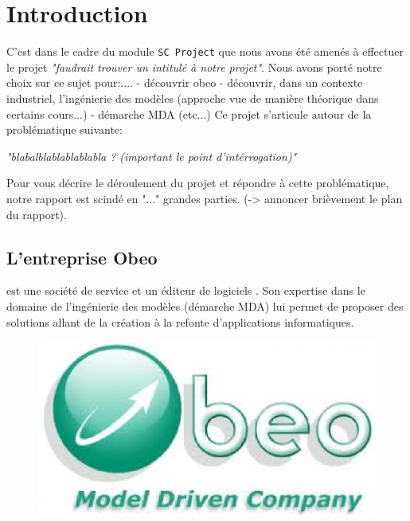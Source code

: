 \chapter{Introduction}\label{chap:Intro}
C'est dans le cadre du module \texttt{SC Project} que nous avons été amenés à effectuer le projet \textit{"faudrait trouver un intitulé à notre projet"}. 
\newline
Nous avons porté notre choix sur ce sujet pour:....
- découvrir obeo 
- découvrir, dans un contexte industriel, l'ingénierie des modèles (approche vue de manière théorique dans certains cours...)
- démarche MDA
\newline
(etc...)
\newline
Ce projet s'articule autour de la problématique suivante:
\begin {center}
\textit{"blabalblablablablabla ? (important le point d'intérrogation)"}
\end{center}
Pour vous décrire le déroulement du projet et répondre à cette problématique, notre rapport est scindé en "..." grandes parties. (-> annoncer brièvement le plan du rapport).
\section{L'entreprise Obeo}
\kwobeo{} est une société de service et un éditeur de logiciels \cite{obeo}. Son expertise dans le domaine de l'ingénierie des modèles (démarche MDA) lui permet de proposer des solutions allant de la création à la refonte d'applications informatiques. 

\begin{figure}[htb]
  \centering
  \includegraphics[scale=.4]{img/logoobeo.eps}
  \label{fig:obeo}
\end{figure}

